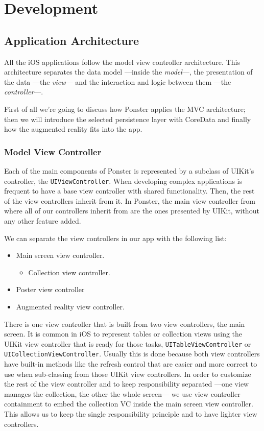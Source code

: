 \chapter{Development}
\section{Application Architecture}
\label{sec:architecture}
All the iOS applications follow the model view controller architecture. This
architecture separates the data model ---inside the \emph{model}---, the presentation
of the data ---the \emph{view}--- and the interaction and logic between them ---the
\emph{controller}---. 

First of all we're going to discuss how Ponster applies the MVC
architecture; then we will introduce the selected persistence layer with CoreData
and finally how the augmented reality fits into the app.

\subsection{Model View Controller}
Each of the main components of Ponster is represented by a subclass of UIKit's
controller, the \texttt{UIViewController}. When developing complex applications is
frequent to have a base view controller with shared functionality. Then, the rest of
the view controllers inherit from it. In Ponster, the main view controller from
where all of our controllers inherit from are the ones presented by UIKit, without
any other feature added. 

We can separate the view controllers in our app with the following list:
\begin{itemize}
\item Main screen view controller.
\begin{itemize}
\item Collection view controller.
\end{itemize}
\item Poster view controller
\item Augmented reality view controller.
\end{itemize}

There is one view controller that is built from two view controllers, the main
screen. It is common in iOS to represent tables or collection views using the UIKit
view controller that is ready for those tasks, \texttt{UITableViewController} or
\texttt{UICollectionViewController}. Usually this is done because both view
controllers have built-in methods like the refresh control that are easier and
more correct to use when sub-classing from those UIKit view controllers. In order to
customize the rest of the view controller and to keep responsibility separated ---one
view manages the collection, the other the whole screen--- we use
view controller containment to embed the collection VC inside the main screen view
controller. This allows us to keep the single responsibility principle and to have
lighter view controllers.

